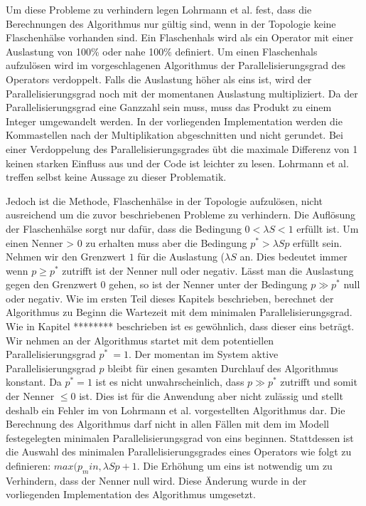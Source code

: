 Um diese Probleme zu verhindern legen Lohrmann et al. fest, dass die Berechnungen des Algorithmus nur gültig sind, wenn in der Topologie keine Flaschenhälse vorhanden sind.
Ein Flaschenhals wird als ein Operator mit einer Auslastung von 100\% oder nahe 100\% definiert.
Um einen Flaschenhals aufzulösen wird im vorgeschlagenen Algorithmus der Parallelisierungsgrad des Operators verdoppelt. Falls die Auslastung höher als eins ist, wird der Parallelisierungsgrad noch mit der momentanen Auslastung multipliziert. Da der Parallelisierungsgrad eine Ganzzahl sein muss, muss das Produkt zu einem Integer umgewandelt werden. In der vorliegenden Implementation werden die Kommastellen nach der Multiplikation abgeschnitten und nicht gerundet. Bei einer Verdoppelung des Parallelisierungsgrades übt die maximale Differenz von 1 keinen starken Einfluss aus und der Code ist leichter zu lesen. Lohrmann et al. treffen selbst keine Aussage zu dieser Problematik.

Jedoch ist die Methode, Flaschenhälse in der Topologie aufzulösen, nicht ausreichend um die zuvor beschriebenen Probleme zu verhindern.
Die Auflösung der Flaschenhälse sorgt nur dafür, dass die Bedingung \( 0 < \lambda S < 1 \) erfüllt ist.
Um einen Nenner > 0 zu erhalten muss aber die Bedingung \(p^\ast > \lambda S p\) erfüllt sein.
Nehmen wir den Grenzwert \(1\) für die Auslastung (\(\lambda S\) an.
Dies bedeutet immer wenn \(p \geq p^\ast\) zutrifft ist der Nenner null oder negativ.
Lässt man die Auslastung gegen den Grenzwert \(0\) gehen, so ist der Nenner unter der Bedingung \(p \gg p^\ast\) null oder negativ.
Wie im ersten Teil dieses Kapitels beschrieben, berechnet der Algorithmus zu Beginn die Wartezeit mit dem minimalen Parallelisierungsgrad.
Wie in Kapitel ******** beschrieben ist es gewöhnlich, dass dieser eins beträgt.
Wir nehmen an der Algorithmus startet mit dem potentiellen Parallelisierungsgrad \(p^\ast\ = 1\).
Der momentan im System aktive Parallelisierungsgrad \(p\) bleibt für einen gesamten Durchlauf des Algorithmus konstant.
Da \(p^\ast = 1\) ist es nicht unwahrscheinlich, dass \(p \gg p^\ast\) zutrifft und somit der Nenner \(\leq 0\) ist.
Dies ist für die Anwendung aber nicht zulässig und stellt deshalb ein Fehler im von Lohrmann et al. vorgestellten Algorithmus dar.
Die Berechnung des Algorithmus darf nicht in allen Fällen mit dem im Modell festegelegten minimalen Parallelisierungsgrad von eins beginnen.
Stattdessen ist die Auswahl des minimalen Parallelisierungsgrades eines Operators wie folgt zu definieren: \(max(p_min, \lambda S p + 1\).
Die Erhöhung um eins ist notwendig um zu Verhindern, dass der Nenner null wird.
Diese Änderung wurde in der vorliegenden Implementation des Algorithmus umgesetzt.

